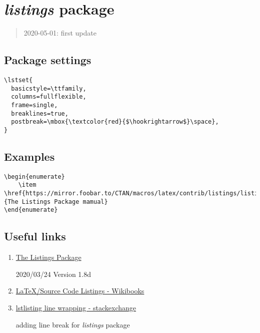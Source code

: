 \section{\textit{listings} package}

\begin{quote}
    2020-05-01: first update
\end{quote}

\subsection{Package settings}

\begin{lstlisting}[language=Tex]
\lstset{
  basicstyle=\ttfamily,
  columns=fullflexible,
  frame=single,
  breaklines=true,
  postbreak=\mbox{\textcolor{red}{$\hookrightarrow$}\space},
}
\end{lstlisting}

\subsection{Examples}

\begin{lstlisting}[language=Tex]
\begin{enumerate}
    \item \href{https://mirror.foobar.to/CTAN/macros/latex/contrib/listings/listings.pdf}{The Listings Package mamual}
\end{enumerate}
\end{lstlisting}

\subsection{Useful links}

\begin{enumerate}

    \item \href{https://mirror.foobar.to/CTAN/macros/latex/contrib/listings/listings.pdf}{The Listings Package}
    
    2020/03/24 Version 1.8d
    \item \href{https://en.wikibooks.org/wiki/LaTeX/Source_Code_Listings}{LaTeX/Source Code Listings - Wikibooks}
    \item \href{https://tex.stackexchange.com/questions/116534/lstlisting-line-wrapping/116572}{lstlisting line wrapping - stackexchange}
    
        adding line break for \textit{listings} package
    
\end{enumerate}
